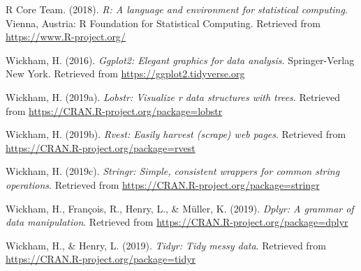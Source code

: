 \documentclass[doc,floatsintext]{apa6}
\begin{document}
\leavevmode\hypertarget{ref-R-base}{}%
R Core Team. (2018). \emph{R: A language and environment for statistical computing}. Vienna, Austria: R Foundation for Statistical Computing. Retrieved from \url{https://www.R-project.org/}

\leavevmode\hypertarget{ref-R-ggplot2}{}%
Wickham, H. (2016). \emph{Ggplot2: Elegant graphics for data analysis}. Springer-Verlag New York. Retrieved from \url{https://ggplot2.tidyverse.org}

\leavevmode\hypertarget{ref-R-lobstr}{}%
Wickham, H. (2019a). \emph{Lobstr: Visualize r data structures with trees}. Retrieved from \url{https://CRAN.R-project.org/package=lobstr}

\leavevmode\hypertarget{ref-R-rvest}{}%
Wickham, H. (2019b). \emph{Rvest: Easily harvest (scrape) web pages}. Retrieved from \url{https://CRAN.R-project.org/package=rvest}

\leavevmode\hypertarget{ref-R-stringr}{}%
Wickham, H. (2019c). \emph{Stringr: Simple, consistent wrappers for common string operations}. Retrieved from \url{https://CRAN.R-project.org/package=stringr}

\leavevmode\hypertarget{ref-R-dplyr}{}%
Wickham, H., François, R., Henry, L., \& Müller, K. (2019). \emph{Dplyr: A grammar of data manipulation}. Retrieved from \url{https://CRAN.R-project.org/package=dplyr}

\leavevmode\hypertarget{ref-R-tidyr}{}%
Wickham, H., \& Henry, L. (2019). \emph{Tidyr: Tidy messy data}. Retrieved from \url{https://CRAN.R-project.org/package=tidyr}

\endgroup
\end{document}
